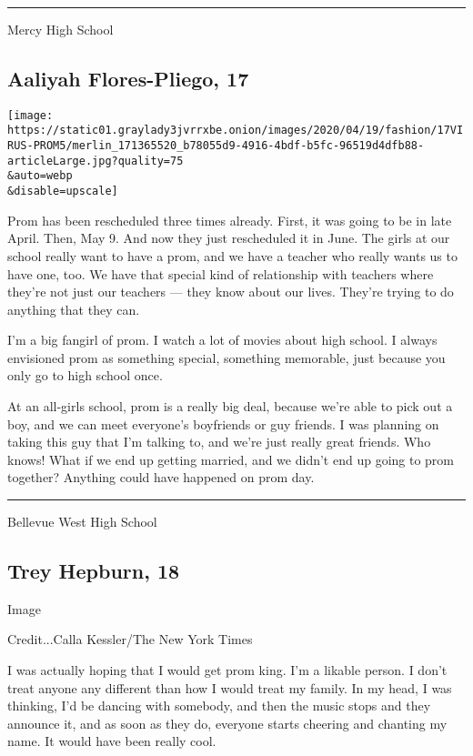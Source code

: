 \begin{center}\rule{0.5\linewidth}{\linethickness}\end{center}

Mercy High School

\hypertarget{aaliyah-flores-pliego-17}{%
\subsection{Aaliyah Flores-Pliego, 17}\label{aaliyah-flores-pliego-17}}

\texttt{[image: https://static01.graylady3jvrrxbe.onion/images/2020/04/19/fashion/17VIRUS-PROM5/merlin\_171365520\_b78055d9-4916-4bdf-b5fc-96519d4dfb88-articleLarge.jpg?quality=75\\\&auto=webp\\\&disable=upscale]}

Prom has been rescheduled three times already. First, it was going to be
in late April. Then, May 9. And now they just rescheduled it in June.
The girls at our school really want to have a prom, and we have a
teacher who really wants us to have one, too. We have that special kind
of relationship with teachers where they're not just our teachers ---
they know about our lives. They're trying to do anything that they can.

I'm a big fangirl of prom. I watch a lot of movies about high school. I
always envisioned prom as something special, something memorable, just
because you only go to high school once.

At an all-girls school, prom is a really big deal, because we're able to
pick out a boy, and we can meet everyone's boyfriends or guy friends. I
was planning on taking this guy that I'm talking to, and we're just
really great friends. Who knows! What if we end up getting married, and
we didn't end up going to prom together? Anything could have happened on
prom day.

\begin{center}\rule{0.5\linewidth}{\linethickness}\end{center}

Bellevue West High School

\hypertarget{trey-hepburn-18}{%
\subsection{Trey Hepburn, 18}\label{trey-hepburn-18}}

Image

Credit...Calla Kessler/The New York Times

I was actually hoping that I would get prom king. I'm a likable person.
I don't treat anyone any different than how I would treat my family. In
my head, I was thinking, I'd be dancing with somebody, and then the
music stops and they announce it, and as soon as they do, everyone
starts cheering and chanting my name. It would have been really cool.

